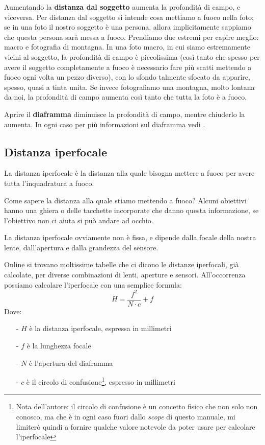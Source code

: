 Aumentando la \textbf{distanza dal soggetto} aumenta la profondità di campo, e viceversa.\newline
Per distanza dal soggetto si intende cosa mettiamo a fuoco nella foto; se in una foto il nostro soggetto è una persona, allora implicitamente sappiamo che questa persona sarà messa a fuoco.
Prendiamo due estremi per capire meglio: macro e fotografia di montagna. In una foto macro, in cui siamo estremamente vicini al soggetto, la profondità di campo è piccolissima (così tanto che spesso per avere il soggetto completamente a fuoco è necessario fare più scatti mettendo a fuoco ogni volta un pezzo diverso), con lo sfondo talmente sfocato da apparire, spesso, quasi a tinta unita. Se invece fotografiamo una montagna, molto lontana da noi, la profondità di campo aumenta così tanto che tutta la foto è a fuoco.

Aprire il \textbf{diaframma} diminuisce la profondità di campo, mentre chiuderlo la aumenta. In ogni caso per più informazioni sul diaframma vedi .


\subsection{Distanza iperfocale} \label{subsec:iperfocale}
La distanza iperfocale è la distanza alla quale bisogna mettere a fuoco per avere tutta l'inquadratura a fuoco.

Come sapere la distanza alla quale stiamo mettendo a fuoco? Alcuni obiettivi hanno una ghiera o delle tacchette incorporate che danno questa informazione, se l'obiettivo non ci aiuta si può andare ad occhio.

La distanza iperfocale ovviamente non è fissa, e dipende dalla focale della nostra lente, dall'apertura e dalla grandezza del sensore.

Online si trovano moltissime tabelle che ci dicono le distanze iperfocali, già calcolate, per diverse combinazioni di lenti, aperture e sensori. All'occorrenza possiamo calcolare l'iperfocale con una semplice formula:
\[ H = \dfrac{f^2}{N \cdot c} + f \]
Dove:
\begin{itemize}
    \item[-] $H$ è la distanza iperfocale, espressa in millimetri
    \item[-] $f$ è la lunghezza focale
    \item[-] $N$ è l'apertura del diaframma
    \item[-] $c$ è il circolo di confusione\footnote{
        Nota dell'autore: il circolo di confusione è un concetto fisico che non solo non conosco, ma che è in ogni caso fuori dallo \textit{scope} di questo manuale, mi limiterò quindi a fornire qualche valore notevole da poter usare per calcolare l'iperfocale
    }, espresso in millimetri
\end{itemize}


